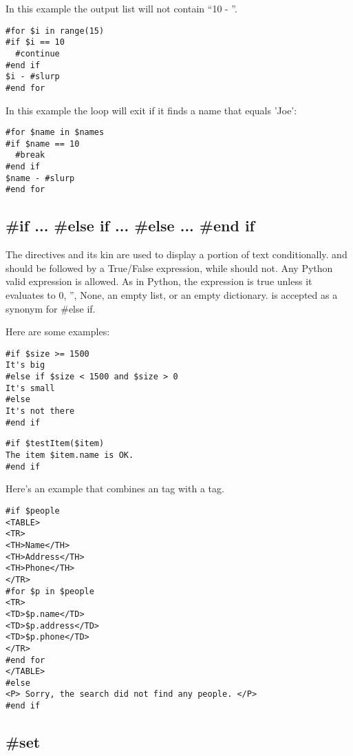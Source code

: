 In this example the output list will not contain ``10 - ''. 
\begin{verbatim}
#for $i in range(15)
#if $i == 10
  #continue
#end if
$i - #slurp
#end for
\end{verbatim}

In this example the loop will exit if it finds a name that equals 'Joe':
\begin{verbatim}
#for $name in $names
#if $name == 10
  #break
#end if
$name - #slurp
#end for
\end{verbatim}


\subsection{\#if ... \#else if ... \#else ... \#end if}
\label{directives.if}

The  directives and its kin are used to display a portion of text
conditionally.  and  should be followed by a
True/False expression, while  should not.  Any Python valid
expression is allowed.  As in Python, the expression is true unless it evaluates
to 0, '', None, an empty list, or an empty dictionary.  is accepted
as a synonym for {\#else if}.

Here are some examples:
\begin{verbatim}
#if $size >= 1500
It's big
#else if $size < 1500 and $size > 0 
It's small
#else
It's not there
#end if
\end{verbatim}

\begin{verbatim}
#if $testItem($item)
The item $item.name is OK.
#end if
\end{verbatim}

Here's an example that combines an  tag with a  tag.
\begin{verbatim}
#if $people
<TABLE>
<TR>
<TH>Name</TH>
<TH>Address</TH>
<TH>Phone</TH>
</TR>
#for $p in $people
<TR>
<TD>$p.name</TD>
<TD>$p.address</TD>
<TD>$p.phone</TD>
</TR>
#end for
</TABLE>
#else
<P> Sorry, the search did not find any people. </P>
#end if
\end{verbatim}

\subsection{\#set}
\label{directives.set}

